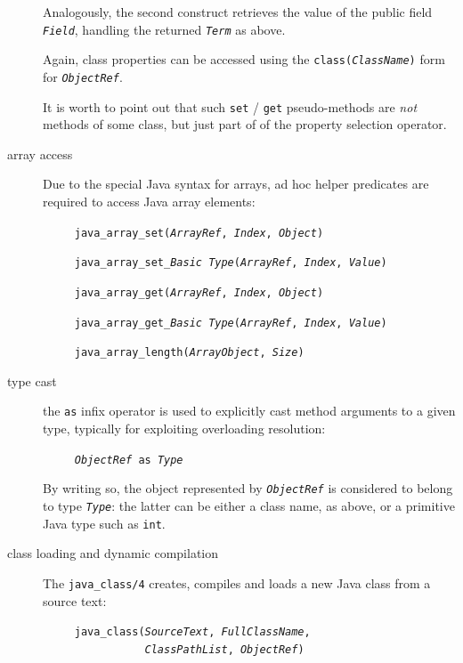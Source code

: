 \begin{description}
        Analogously, the second construct retrieves the value of the public field
        \texttt{\textit{Field}}, handling the returned \texttt{\textit{Term}} as above.

        Again, class properties can be accessed using the  \texttt{class(\textit{ClassName})} form for  \texttt{\textit{ObjectRef}}.

        It is worth to point out that such \texttt{set} / \texttt{get}
        pseudo-methods are \textit{not} methods of some class, but just
        part of of the property selection operator.

  \item [array access]
        Due to the special Java syntax for arrays, ad hoc helper predicates are required to access Java array elements:

        \texttt{~~~~~java\_array\_set(\textit{ArrayRef}, \textit{Index}, \textit{Object})}

        \texttt{~~~~~java\_array\_set\_\textit{\emph{Basic Type}}(\textit{ArrayRef}, \textit{Index}, \textit{Value})}

        \texttt{~~~~~java\_array\_get(\textit{ArrayRef}, \textit{Index}, \textit{Object})}

        \texttt{~~~~~java\_array\_get\_\textit{\emph{Basic Type}}(\textit{ArrayRef}, \textit{Index}, \textit{Value})}

        \texttt{~~~~~java\_array\_length(\textit{ArrayObject}, \textit{Size})}

  \item [type cast]
        the \texttt{as} infix operator is used to explicitly cast method arguments to a given type, typically for exploiting overloading resolution:

        \texttt{~~~~~\textit{ObjectRef} as \textit{Type}}

        By writing so, the object represented by \texttt{\textit{ObjectRef}} is
        considered to belong to type \texttt{\textit{Type}}: the latter can be either a class name, as above, or a primitive Java type such as \texttt{int}.

  \item [class loading and dynamic compilation]
        The \texttt{java\_class/4} creates, compiles and loads a new Java class from a source text:

        \texttt{~~~~~java\_class(\textit{SourceText}, \textit{FullClassName},}\\
        \texttt{\mbox{~~~~~~~~~~~~~~~~}\textit{ClassPathList}, \textit{ObjectRef})}


\end{description}
